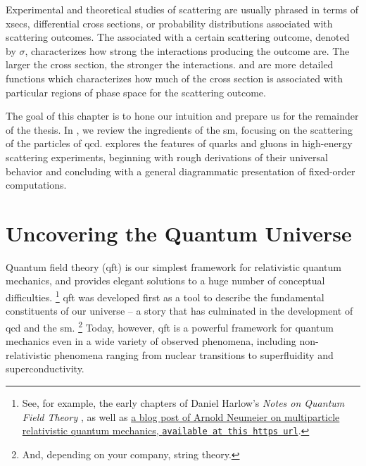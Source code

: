 Experimental and theoretical studies of scattering are usually phrased in terms of \glspl{xsec}, differential cross sections, or probability distributions associated with scattering outcomes.
%
The  associated with a certain scattering outcome, denoted by \(\sigma\), characterizes how strong the interactions producing the outcome are.
%
The larger the cross section, the stronger the interactions.
%
 and  are more detailed functions which characterizes how much of the cross section is associated with particular regions of phase space for the scattering outcome.


The goal of this chapter is to hone our intuition and prepare us for the remainder of the thesis.
%
In , we review the ingredients of the \gls{sm}, focusing on the scattering of the particles of \gls{qcd}.
%
 explores the features of quarks and gluons in high-energy scattering experiments, beginning with rough derivations of their universal behavior and concluding with a general diagrammatic presentation of fixed-order computations.



\section{Uncovering the Quantum Universe}
\label{sec:sm-scattering-review}

Quantum field theory (\gls{qft}) is our simplest framework for relativistic quantum mechanics, and provides elegant solutions to a huge number of conceptual difficulties.%
\footnote{
See, for example, the early chapters of Daniel Harlow's  \textit{Notes on Quantum Field Theory} \cite{Harlow:2024zz}, as well as \href{https://arnold-neumaier.at/physfaq/topics/multi.html}{a blog post of Arnold Neumeier on multiparticle relativistic quantum mechanics, \texttt{available at this https url}}.
}
%
\Gls{qft} was developed first as a tool to describe the fundamental constituents of our universe -- a story that has culminated in the development of \gls{qcd} and the \gls{sm}.%
\footnote{
    And, depending on your company, string theory.
}
%
Today, however, \gls{qft} is a powerful framework for quantum mechanics even in a wide variety of observed phenomena, including non-relativistic phenomena ranging from nuclear transitions to superfluidity and superconductivity.

